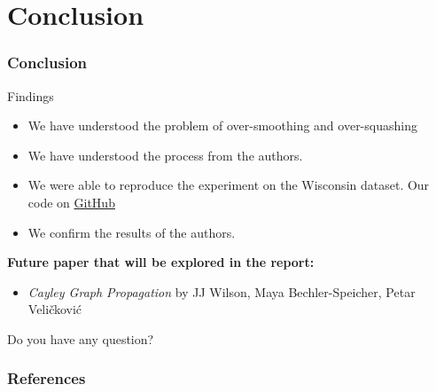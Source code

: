 \documentclass[10pt, aspectratio = 169]{beamer}
\begin{document}
\section{Conclusion}
\begin{frame}
    \frametitle{Conclusion}
    \begin{block}{Findings}
        \begin{itemize}
            \item We have understood the problem of over-smoothing and over-squashing
            \item We have understood the process from the authors.
            \item We were able to reproduce the experiment on the Wisconsin dataset. Our code on \href{https://github.com/waddason/Delaunay-Rewiring}{GitHub}
            \item We confirm the results of the authors.
        \end{itemize}
    \end{block}
    \textbf{Future paper that will be explored in the report:}
    \begin{itemize}
        \item \textit{Cayley Graph Propagation} by JJ Wilson, Maya 
        Bechler-Speicher, Petar Veličković \cite{wilson2024cayleygraphpropagation}
    \end{itemize}

    \begin{block}{Do you have any question?}
        
    \end{block}
\end{frame}

\begin{frame}[allowframebreaks]
    \frametitle{References}
    \scriptsize
    
    

\end{frame}
\end{document}

